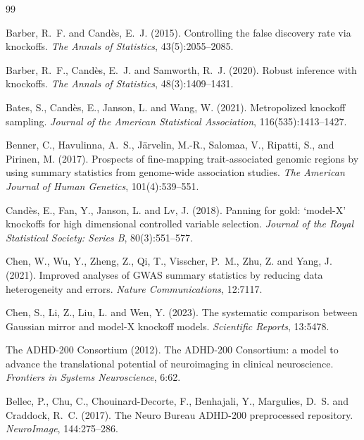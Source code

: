 \documentclass[11pt,a4paper]{article}
\begin{document}
\begin{thebibliography}{99}

Barber, R.~F. and Cand\`es, E.~J. (2015).
Controlling the false discovery rate via knockoffs.
\emph{The Annals of Statistics}, 43(5):2055--2085.

Barber, R.~F., Cand\`es, E.~J. and Samworth, R.~J. (2020).
Robust inference with knockoffs.
\emph{The Annals of Statistics}, 48(3):1409--1431.

Bates, S., Cand\`es, E., Janson, L. and Wang, W. (2021).
Metropolized knockoff sampling.
\emph{Journal of the American Statistical Association}, 116(535):1413--1427.

Benner, C., Havulinna, A.~S., J\"arvelin, M.-R., Salomaa, V., Ripatti, S.,
and Pirinen, M. (2017).
Prospects of fine-mapping trait-associated genomic regions by using summary
statistics from genome-wide association studies.
\emph{The American Journal of Human Genetics}, 101(4):539--551.

Cand\`es, E., Fan, Y., Janson, L. and Lv, J. (2018).
Panning for gold: `model-X' knockoffs for high dimensional controlled
variable selection.
\emph{Journal of the Royal Statistical Society: Series B}, 80(3):551--577.

Chen, W., Wu, Y., Zheng, Z., Qi, T., Visscher, P.~M., Zhu, Z. and Yang, J.
(2021).
Improved analyses of GWAS summary statistics by reducing data heterogeneity
and errors.
\emph{Nature Communications}, 12:7117.

Chen, S., Li, Z., Liu, L. and Wen, Y. (2023).
The systematic comparison between Gaussian mirror and model-X knockoff
models.
\emph{Scientific Reports}, 13:5478.

The ADHD-200 Consortium (2012).
The ADHD-200 Consortium: a model to advance the translational potential of
neuroimaging in clinical neuroscience.
\emph{Frontiers in Systems Neuroscience}, 6:62.

Bellec, P., Chu, C., Chouinard-Decorte, F., Benhajali, Y., Margulies, D.~S.
and Craddock, R.~C. (2017).
The Neuro Bureau ADHD-200 preprocessed repository.
\emph{NeuroImage}, 144:275--286.


\end{thebibliography}
\end{document}
